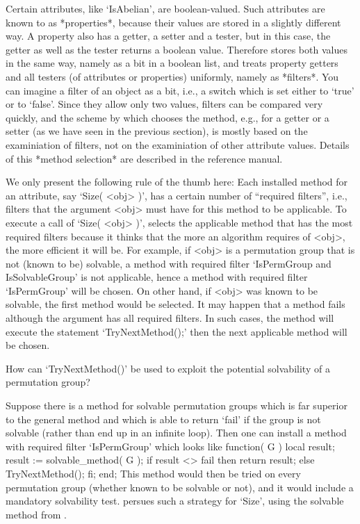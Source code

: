 %
%
Certain attributes, like `IsAbelian', are boolean-valued. Such attributes
are known to {\GAP} as *properties*, because their values are stored in a
slightly different way. A  property  also has a   getter, a setter  and a
tester, but  in this case,  the getter as  well  as the  tester returns a
boolean   value. Therefore {\GAP} stores  both  values  in  the same way,
namely as  a bit in  a boolean list, and  treats property getters and all
testers (of attributes or properties) uniformly, namely as *filters*. You
can imagine a filter of an  object as a bit,  i.e., a switch which is set
either to `true' or to `false'. Since they allow only two values, filters
can be compared very quickly, and the  scheme by which {\GAP} chooses the
method, e.g., for a getter or  a setter (as we  have seen in the previous
section),  is mostly based  on the  examiniation  of filters, not  on the
examiniation   of   other  attribute values.    Details  of this  *method
selection* are described in the reference manual.

We only   present the following rule  of  the thumb here:  Each installed
method for an  attribute, say `Size( <obj>   )', has a certain number  of
``required filters'', i.e., filters that the argument <obj> must have for
this method  to be applicable.  To execute  a  call  of `Size( <obj>  )',
{\GAP}  selects the applicable method  that has the most required filters
because it thinks that the more an algorithm  requires of <obj>, the more
efficient it will be.  For example, if  <obj> is a permutation group that
is not (known to be) solvable, a method with required filter `IsPermGroup
and IsSolvableGroup'  is  not  applicable, hence a  method  with required
filter `IsPermGroup' will be chosen. On other hand, if <obj> was known to
be solvable, the  first method would be selected.   It may happen  that a
method  fails although  the argument  has  all required filters.  In such
cases, the method will  execute the statement `TryNextMethod();' then the
next applicable method will be chosen.

\exercise How  can  `TryNextMethod()' be used   to exploit  the potential
solvability of a permutation group?

\answer Suppose  there is a method for  solvable permutation groups which
is far superior to the general method and which  is able to return `fail'
if the  group is not solvable  (rather than end up  in an infinite loop).
Then one can install a  method with  required filter `IsPermGroup'  which
looks like
\begintt
    function( G )
    local  result;
        result := solvable_method( G );
        if result <> fail  then  return result;
                           else  TryNextMethod();  fi;
    end;
\endtt
This method would then be tried on every permutation group (whether known
to be  solvable or  not),  and it would  include a  mandatory solvability
test.  {\GAP} persues  such  a strategy for   `Size',  using the solvable
method from \cite{Sims90b}.

